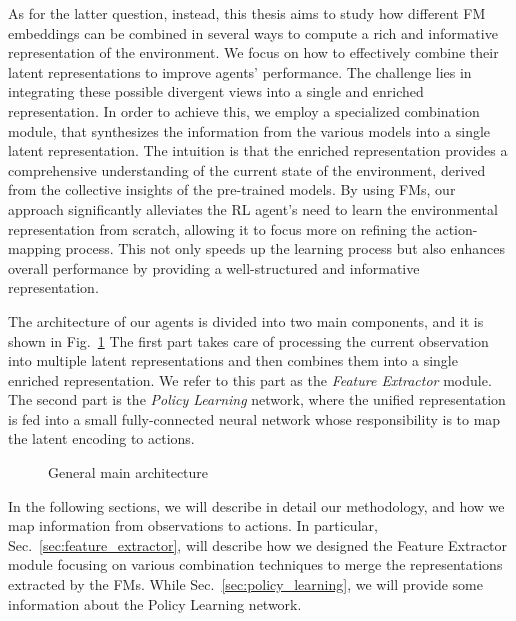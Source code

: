 As for the latter question, instead, this thesis aims to study how different FM embeddings can be combined in several ways to compute a rich and informative representation of the environment.
We focus on how to effectively combine their latent representations to improve agents' performance.
The challenge lies in integrating these possible divergent views into a single and enriched representation.
In order to achieve this, we employ a specialized combination module, that synthesizes the information from the various models into a single latent representation.
The intuition is that the enriched representation provides a comprehensive understanding of the current state of the environment, derived from the collective insights of the pre-trained models.
By using FMs, our approach significantly alleviates the RL agent's need to learn the environmental representation from scratch, allowing it to focus more on refining the action-mapping process.
This not only speeds up the learning process but also enhances overall performance by providing a well-structured and informative representation.

The architecture of our agents is divided into two main components, and it is shown in Fig.~\ref{fig:main}
The first part takes care of processing the current observation into multiple latent representations and then combines them into a single enriched representation.
We refer to this part as the \textit{Feature Extractor} module.
The second part is the \textit{Policy Learning} network, where the unified representation is fed into a small fully-connected neural network whose responsibility is to map the latent encoding to actions.


\begin{figure}[ht]
    \begin{center}
        \fbox{\rule[-.5cm]{0cm}{4cm} \rule[-.5cm]{4cm}{0cm}}
    \end{center}
    \caption{General main architecture}
    \label{fig:main}
\end{figure}


In the following sections, we will describe in detail our methodology, and how we map information from observations to actions.
In particular, Sec.~\ref{sec:feature_extractor}, will describe how we designed the Feature Extractor module focusing on various combination techniques to merge the representations extracted by the FMs.
While Sec.~\ref{sec:policy_learning}, we will provide some information about the Policy Learning network.




